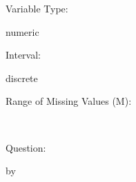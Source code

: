 \documentclass[
]{article}
\begin{document}
\begin{minipage}[t]{0.3\linewidth}

Variable Type:

\end{minipage}%
\begin{minipage}[t]{0.7\linewidth}

numeric

\end{minipage}

\begin{minipage}[t]{0.3\linewidth}

Interval:

\end{minipage}%
\begin{minipage}[t]{0.7\linewidth}

discrete

\end{minipage}

\begin{minipage}[t]{0.3\linewidth}

Range of Missing Values (M):

\end{minipage}%
\begin{minipage}[t]{0.7\linewidth}

~

\end{minipage}

\begin{minipage}[t]{0.3\linewidth}

Question:

\end{minipage}%
\begin{minipage}[t]{0.7\linewidth}

by

\end{minipage}
\end{document}
